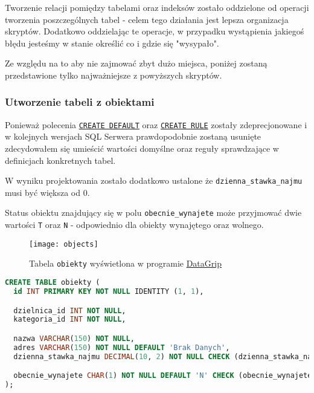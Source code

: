 Tworzenie relacji pomiędzy tabelami oraz indeksów zostało oddzielone od operacji tworzenia poszczególnych tabel - celem tego działania jest lepsza organizacja skryptów. Dodatkowo oddzielając te operacje, w przypadku wystąpienia jakiegoś błędu jesteśmy w stanie określić co i gdzie się "wysypało".

Ze względu na to aby nie zajmować zbyt dużo miejsca, poniżej zostaną przedstawione tylko najważniejsze z powyższych skryptów.

\subsubsection{Utworzenie tabeli z obiektami}

Ponieważ polecenia \href{https://docs.microsoft.com/pl-pl/sql/t-sql/statements/create-default-transact-sql?view=sql-server-2017}{\texttt{CREATE DEFAULT}} oraz \href{https://docs.microsoft.com/pl-pl/sql/t-sql/statements/create-rule-transact-sql?view=sql-server-2017}{\texttt{CREATE RULE}} zostały zdeprecjonowane i w kolejnych wersjach SQL Serwera prawdopodobnie zostaną usunięte zdecydowałem się umieścić wartości domyślne oraz reguły sprawdzające w definicjach konkretnych tabel.

W wyniku projektowania zostało dodatkowo ustalone że \texttt{dzienna\_stawka\_najmu} musi być większa od 0.

Status obiektu znajdujący się w polu \texttt{obecnie\_wynajete} może przyjmować dwie wartości \texttt{T} oraz \texttt{N} - odpowiednio dla obiekty wynajętego oraz wolnego.

\begin{figure}[h]
	\centering
    \texttt{[image: objects]}
	\caption{Tabela \texttt{obiekty} wyświetlona w programie \href{https://www.jetbrains.com/datagrip/}{DataGrip}}
	\label{fig:objects}
\end{figure}

\begin{lstlisting}[language=SQL, caption={Skrypt tworzący tabelę \texttt{obiekty}}, label={lst:table-objects}]
CREATE TABLE obiekty (
  id INT PRIMARY KEY NOT NULL IDENTITY (1, 1),

  dzielnica_id INT NOT NULL,
  kategoria_id INT NOT NULL,

  nazwa VARCHAR(150) NOT NULL,
  adres VARCHAR(150) NOT NULL DEFAULT 'Brak Danych',
  dzienna_stawka_najmu DECIMAL(10, 2) NOT NULL CHECK (dzienna_stawka_najmu > 0),

  obecnie_wynajete CHAR(1) NOT NULL DEFAULT 'N' CHECK (obecnie_wynajete IN ('T', 'N')),
);
\end{lstlisting}

